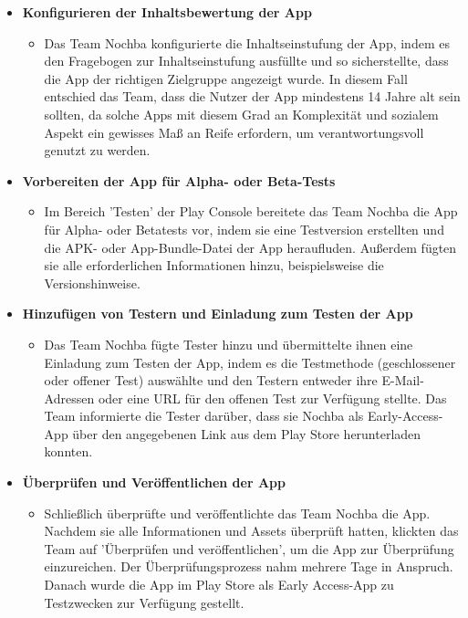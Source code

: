 \begin{itemize}
\begin{itemize}
          \end{itemize}
    \item \textbf{Konfigurieren der Inhaltsbewertung der App}
          \begin{itemize}
              \item {Das Team Nochba konfigurierte die Inhaltseinstufung der App, indem es den Fragebogen zur Inhaltseinstufung ausfüllte und so sicherstellte, dass die App der richtigen Zielgruppe angezeigt wurde. In diesem Fall entschied das Team, dass die Nutzer der App mindestens 14 Jahre alt sein sollten, da solche Apps mit diesem Grad an Komplexität und sozialem Aspekt ein gewisses Maß an Reife erfordern, um verantwortungsvoll genutzt zu werden.}
          \end{itemize}
    \item \textbf{Vorbereiten der App für Alpha- oder Beta-Tests}
          \begin{itemize}
              \item {Im Bereich 'Testen' der Play Console bereitete das Team Nochba die App für Alpha- oder Betatests vor, indem sie eine Testversion erstellten und die APK- oder App-Bundle-Datei der App heraufluden. Außerdem fügten sie alle erforderlichen Informationen hinzu, beispielsweise die Versionshinweise.}
          \end{itemize}
    \item \textbf{Hinzufügen von Testern und Einladung zum Testen der App}
          \begin{itemize}
              \item {Das Team Nochba fügte Tester hinzu und übermittelte ihnen eine Einladung zum Testen der App, indem es die Testmethode (geschlossener oder offener Test) auswählte und den Testern entweder ihre E-Mail-Adressen oder eine URL für den offenen Test zur Verfügung stellte. Das Team informierte die Tester darüber, dass sie Nochba als Early-Access-App über den angegebenen Link aus dem Play Store herunterladen konnten.}
          \end{itemize}
    \item \textbf{Überprüfen und Veröffentlichen der App}
          \begin{itemize}
              \item {Schließlich überprüfte und veröffentlichte das Team Nochba die App. Nachdem sie alle Informationen und Assets überprüft hatten, klickten das Team auf 'Überprüfen und veröffentlichen', um die App zur Überprüfung einzureichen. Der Überprüfungsprozess nahm mehrere Tage in Anspruch. Danach wurde die App im Play Store als Early Access-App zu Testzwecken zur Verfügung gestellt.}
          \end{itemize}
\end{itemize}

